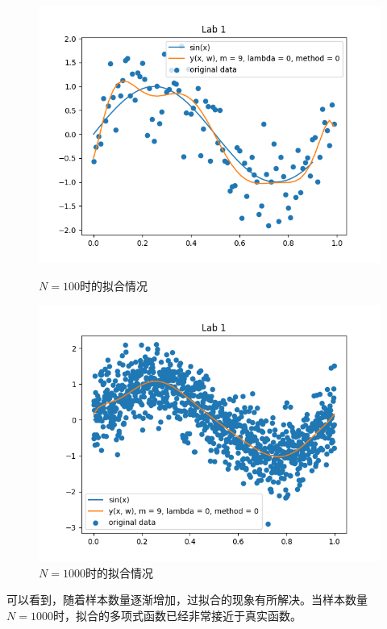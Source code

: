 \begin{figure}
    \begin{minipage}[t]{0.5\linewidth}
        \centering
        \includegraphics[width=\textwidth]{figures/Figure_7.png}
        \caption{$N = 100$时的拟合情况}
        \label{N100}
    \end{minipage}
    \begin{minipage}[t]{0.5\linewidth}
        \centering
        \includegraphics[width=\textwidth]{figures/Figure_8.png}
        \caption{$N = 1000$时的拟合情况}
        \label{N1000}
    \end{minipage}
\end{figure}

可以看到，随着样本数量逐渐增加，过拟合的现象有所解决。当样本数量$N = 1000$时，拟合的多项式函数已经非常接近于真实函数。

